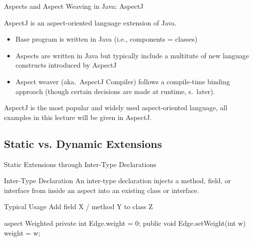 \begin{frame}{Aspects and Aspect Weaving in Java: AspectJ}
	\begin{mycolumns}[animation=none]
		\begin{definition}{}
			AspectJ is an aspect-oriented language extension of Java.
			\begin{itemize}
				\item Base program is written in Java (i.e., components = classes)
				\item Aspects are written in Java but typically include a multitute of new language constructs introduced by AspectJ
				\item Aspect weaver (aka.\ AspectJ Compiler) follows a compile-time binding approach (though certain decisions are made at runtime, s.\ later).
			\end{itemize}
		\end{definition}
		\begin{note}{}
			AspectJ is the most popular and widely used aspect-oriented language, all examples in this lecture will be given in AspectJ.
		\end{note}
	\mynextcolumn
		\begin{exampletight}{}
			\centering
		\end{exampletight}
	\end{mycolumns}
\end{frame}

\subsection{Static vs. Dynamic Extensions}

\begin{frame}[fragile]{Static Extensions through Inter-Type Declarations}
	\begin{mycolumns}[animation=none]
		\begin{definition}{Inter-Type Declaration }
			An inter-type declaration  injects a method, field, or interface from inside an aspect into an existing class or interface.
		\end{definition}
		\begin{note}{Typical Usage}
			Add field X / method Y to class Z
		\end{note}
	\mynextcolumn
\begin{codetight}{}
aspect Weighted {
	private int Edge.weight = 0;
	public void Edge.setWeight(int w) {
		weight = w;
	}
}
\end{codetight}
	\end{mycolumns}
\end{frame}

